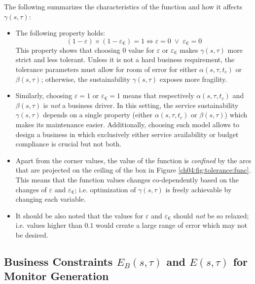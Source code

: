 The following summarizes the characteristics of the function and how it affects $\gamma(s,\tau)$:
\begin{itemize}
\item The following property holds:
\[
(1-\varepsilon) \times (1-\varepsilon_{\euro}) = 1 \iff \varepsilon = 0 \;\lor\; \varepsilon_{\euro} = 0
\]
This property shows that choosing $0$ value for $\varepsilon$ or $\varepsilon_{\euro}$ makes $\gamma(s,\tau)$ more strict and less tolerant. 
Unless it is not a hard business requirement, the tolerance parameters must allow for room of error for either $\alpha(s,\tau,t_c)$ or $\beta(s,\tau)$; otherwise, the sustainability $\gamma(s,\tau)$ exposes more fragility.
\item Similarly, choosing $\varepsilon = 1$ or $\varepsilon_{\euro} = 1$ means that respectively $\alpha(s,\tau,t_c)$ and $\beta(s,\tau)$ is \emph{not} a business driver.
In this setting, the service sustainability $\gamma(s,\tau)$ depends on a single property (either $\alpha(s,\tau,t_c)$ or $\beta(s,\tau)$) which makes its maintenance easier.
Additionally, choosing such model allows to design a business in which exclusively either service availability or budget compliance is crucial but not both.
\item Apart from the corner values, the value of the function is \emph{confined} by the arcs that are projected on the ceiling of the box in Figure \ref{ch04:fig:tolerance:func}.
This means that the function values changes co-dependently based on the changes of $\varepsilon$ and $\varepsilon_{\euro}$; i.e. optimization of $\gamma(s,\tau)$ is freely achievable by changing each variable.
\item It should be also noted that the values for $\varepsilon$ and $\varepsilon_{\euro}$ should \emph{not} be so relaxed; 
i.e. values higher than $0.1$ would create a large range of error which may not be desired.
\end{itemize}


\subsection{Business Constraints $E_B(s,\tau)$ and $E(s,\tau)$ for Monitor Generation}

